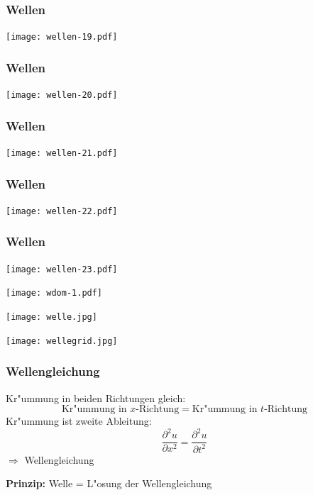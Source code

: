 \begin{frame}
\frametitle{Wellen}
\begin{center}
\texttt{[image: wellen-19.pdf]}
\end{center}
\end{frame}

\begin{frame}
\frametitle{Wellen}
\begin{center}
\texttt{[image: wellen-20.pdf]}
\end{center}
\end{frame}

\begin{frame}
\frametitle{Wellen}
\begin{center}
\texttt{[image: wellen-21.pdf]}
\end{center}
\end{frame}

\begin{frame}
\frametitle{Wellen}
\begin{center}
\texttt{[image: wellen-22.pdf]}
\end{center}
\end{frame}

\begin{frame}
\frametitle{Wellen}
\begin{center}
\texttt{[image: wellen-23.pdf]}
\end{center}
\end{frame}

\begin{frame}
\begin{center}
\texttt{[image: wdom-1.pdf]}
\end{center}
\end{frame}

\begin{frame}
\begin{center}
\texttt{[image: welle.jpg]}
\end{center}
\end{frame}

\begin{frame}
\begin{center}
\texttt{[image: wellegrid.jpg]}
\end{center}
\end{frame}

\begin{frame}
\frametitle{Wellengleichung}
Kr"ummung in beiden Richtungen gleich:
\[
\text{Kr"ummung in $x$-Richtung}
=
\text{Kr"ummung in $t$-Richtung}
\]
Kr"ummung ist zweite Ableitung:
\[
\frac{\partial^2 u}{\partial x^2}
=
\frac{\partial^2 u}{\partial t^2}
\]
$\Rightarrow$
Wellengleichung
\bigskip

{\bf Prinzip:}
Welle = L"osung der Wellengleichung
\end{frame}

